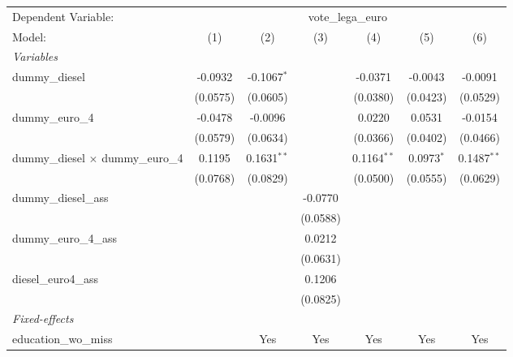 
\begingroup
\centering
\begin{tabular}{lcccccc}
   \tabularnewline \midrule \midrule
   Dependent Variable: & \multicolumn{6}{c}{vote\_lega\_euro}\\
   Model:                                    & (1)      & (2)           & (3)      & (4)           & (5)          & (6)\\  
   \midrule
   \emph{Variables}\\
   dummy\_diesel                             & -0.0932  & -0.1067$^{*}$ &          & -0.0371       & -0.0043      & -0.0091\\   
                                             & (0.0575) & (0.0605)      &          & (0.0380)      & (0.0423)     & (0.0529)\\   
   dummy\_euro\_4                            & -0.0478  & -0.0096       &          & 0.0220        & 0.0531       & -0.0154\\   
                                             & (0.0579) & (0.0634)      &          & (0.0366)      & (0.0402)     & (0.0466)\\   
   dummy\_diesel $\times$ dummy\_euro\_4     & 0.1195   & 0.1631$^{**}$ &          & 0.1164$^{**}$ & 0.0973$^{*}$ & 0.1487$^{**}$\\   
                                             & (0.0768) & (0.0829)      &          & (0.0500)      & (0.0555)     & (0.0629)\\   
   dummy\_diesel\_ass                        &          &               & -0.0770  &               &              &   \\   
                                             &          &               & (0.0588) &               &              &   \\   
   dummy\_euro\_4\_ass                       &          &               & 0.0212   &               &              &   \\   
                                             &          &               & (0.0631) &               &              &   \\   
   diesel\_euro4\_ass                        &          &               & 0.1206   &               &              &   \\   
                                             &          &               & (0.0825) &               &              &   \\   
   \midrule
   \emph{Fixed-effects}\\
   education\_wo\_miss                       &          & Yes           & Yes      & Yes           & Yes          & Yes\\  

\end{tabular}
